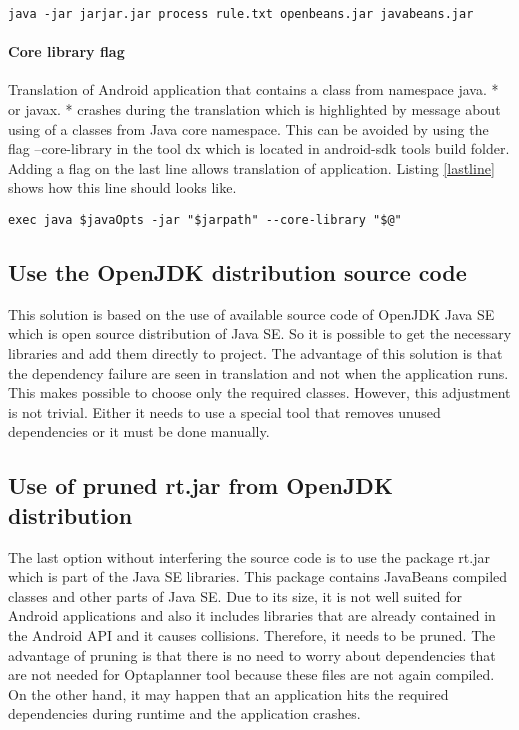 \begin{lstlisting}[captionpos={b},caption={Command for repacking jar.},frame={lines},label={command},basicstyle=\footnotesize]
java -jar jarjar.jar process rule.txt openbeans.jar javabeans.jar
\end{lstlisting}

\paragraph{Core library flag}
Translation of Android application that contains a class from namespace java. * or javax. * crashes during the translation which is highlighted by message about using of a classes from Java core namespace. This can be avoided by using the flag --core-library in the tool dx which is located in android-sdk tools build folder. Adding a flag on the last line allows translation of application. Listing \ref{lastline} shows how this line should looks like.
\\
\begin{lstlisting}[captionpos={b},caption={Spanning tree broadcast algorithm.},frame={lines},label={lastline},basicstyle=\footnotesize]
exec java $javaOpts -jar "$jarpath" --core-library "$@"
\end{lstlisting}

\subsection{Use the OpenJDK distribution source code}
This solution is based on the use of available source code of OpenJDK Java SE which is open source distribution of Java SE. So it is possible to get the necessary libraries and add them directly to project. The advantage of this solution is that the dependency failure are seen in translation and not when the application runs. This makes possible to choose only the required classes. However, this adjustment is not trivial. Either it needs to use a special tool that removes unused dependencies or it must be done manually.

\subsection{Use of pruned rt.jar from OpenJDK distribution}
The last option without interfering the source code is to use the package rt.jar which is part of the Java SE libraries. This package contains JavaBeans compiled classes and other parts of Java SE. Due to its size, it is not well suited for Android applications and also it includes libraries that are already contained in the Android API and it causes collisions. Therefore, it needs to be pruned. The advantage of pruning is that there is no need to worry about dependencies that are not needed for Optaplanner tool because these files are not again compiled. On the other hand, it may happen that an application hits the required dependencies during runtime and the application crashes.

